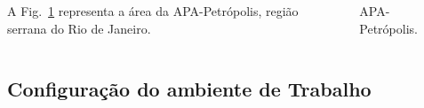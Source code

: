 \documentclass[%
  10pt,%
  aspectratio = 169,%
  compress,%
  t,%
  english,%
  brazilian,%
  tikz,
]{beamer}
\begin{document}
\begin{frame}
\begin{columns}[T]
A Fig.~\ref{fig:apa} representa a área da APA-Petrópolis, região serrana do Rio de Janeiro.
\begin{figure}[!htb]
\centering%
\caption{APA-Petrópolis.}%
\label{fig:apa}
\end{figure}
\end{columns}
\end{frame}

\subsection{Configuração do ambiente de Trabalho}\label{ssec:matmet3}
\end{document}
